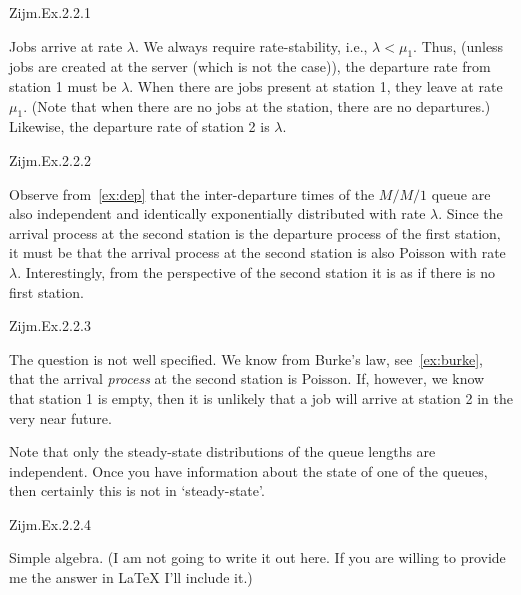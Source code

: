 \begin{exercise}
Zijm.Ex.2.2.1
\begin{solution}
Jobs arrive at rate $\lambda$. We always require rate-stability, i.e., $\lambda<\mu_1$. Thus, (unless jobs are created at the server (which is not the case)), the departure rate from station 1 must be $\lambda$. When there are jobs present at station 1, they leave at rate $\mu_1$. (Note that when there are no jobs at the station, there are no departures.) Likewise, the departure rate of station 2 is $\lambda$. 
\end{solution}
\end{exercise}

\begin{exercise}
Zijm.Ex.2.2.2
\begin{solution}
 Observe from~\cref{ex:dep} that the inter-departure times of the $M/M/1$ queue are also independent and identically exponentially distributed with rate $\lambda$.
 Since the arrival process at the second station is the departure process of the first station, it must be that the arrival process at the second station is also Poisson with rate $\lambda$.
 Interestingly, from the perspective of the second station it is as if there is no first station.
\end{solution}
\end{exercise}



\begin{exercise}
Zijm.Ex.2.2.3 
\begin{solution}
 The question is not well specified. We know from Burke's law, see~\cref{ex:burke}, that
 the arrival \emph{process} at the second station is Poisson. If,
 however, we know that station 1 is empty, then it is unlikely that a
 job will arrive at station 2 in the very near future.

 Note that only the steady-state distributions of the queue lengths
 are independent. Once you have information about the state of one of
 the queues, then certainly this is not in `steady-state'.
\end{solution}
\end{exercise}

\begin{exercise}
Zijm.Ex.2.2.4
\begin{solution}
 Simple algebra. (I am not going to write it out here. If you are
 willing to provide me the answer in \LaTeX\/ I'll include it.)
\end{solution}
\end{exercise}

